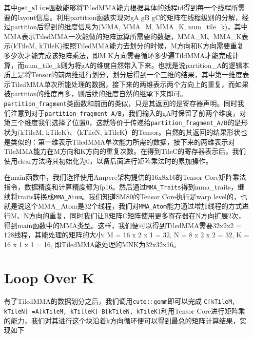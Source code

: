 其中\lstinline|get_slice|函数能够将TiledMMA能力根据具体的线程id得到每一个线程所需要的layout信息。利用partition函数实现对gA gB gC的矩阵在线程级别的分解，经过partition后得到的维度信息为(MMA, MMA\_M, MMA\_K, num\_tile\_k)，其中MMA表示TiledMMA一次能做的矩阵运算所需要的数据，MMA\_M、MMA\_K表示(kTileM, kTileK)按照TiledMMA能力去划分的时候，M方向和K方向需要重复多少次才能完成该矩阵乘法，即M K方向需要循环多少遍TildMMA才能完成计算，而num\_tile\_k则为将gA的维度自然带入下来。也就是说partition\_A的逻辑本质上是将Tensor的前两维进行划分，划分后得到一个三维的结果，其中第一维度表示TiledMMA单次所能处理的数据，接下来的两维表示两个方向上的重复，而如果被partition的维度再多，则后续的维度自然的继承下来即可。\lstinline|partition_fragment|类函数和前面的类似，只是其返回的是寄存器声明。同时我们注意到对于\lstinline|partition_fragment_A/B|，我们输入的gA时保留了前两个维度，对第三个维度我们选择了位置0，这就等价于传递给\lstinline|partition_fragment_A/B|的是形状为(kTileM, kTileK)、（kTileN, kTileK）的Tensor。自然的其返回的结果形状也是类似的：第一维表示TiledMMA单次能力所需的数据，接下来的两维表示对TileMMA能力在M方向和K方向的重复次数。在得到TileC的寄存器表示后，我们使用clear方法将其初始化为0，以备后面进行矩阵乘法时的累加操作。

在main函数中，我们选择使用Ampere架构提供的16x8x16的Tensor Core矩阵乘法指令，数据精度和计算精度都为fp16。然后通过\lstinline|MMA_Traits|得到mma\_traits，继续将traits转换成\lstinline|MMA_Atom|。我们知道SM80的Tensor Core执行是warp level的，也就是说这个MMA\_Atom是32个线程，我们对\lstinline|MMA_Atom|能力通过增加线程的方式进行M、N方向的重复，同时我们让B矩阵C矩阵使用更多寄存器在N方向扩展2次，得到main函数中的MMA类型。这样，我们便可以得到TiledMMA需要32x2x2 = 128线程，其能处理的矩阵的大小: M = 16 x 2 x 1 = 32, N = 8 x 2 x 2 = 32, K = 16 x 1 x 1 = 16, 即TiledMMA能处理的MNK为32x32x16。

\section{Loop Over K}

有了TiledMMA的数据划分之后，我们调用\lstinline|cute::gemm|即可以完成 \lstinline|C[kTileM, kTileN] =A[kTileM, kTilleK] B[kTileN, kTileK]|利用Tensor Core进行矩阵乘的能力，我们对其进行这个块沿着k方向循环便可以得到最总的矩阵计算结果，实现如下


